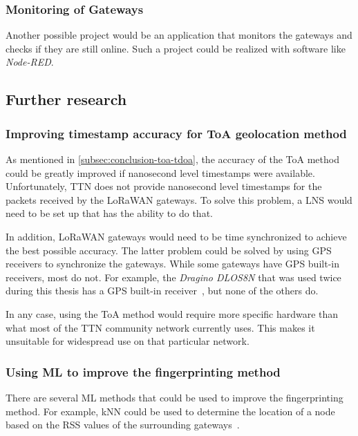 \subsubsection{Monitoring of Gateways}

Another possible project would be an application that monitors the gateways and checks if they are still online.
Such a project could be realized with software like \emph{Node-RED}.~\cite{openjs_foundation_node-red_nodate}

\subsection{Further research}

\subsubsection{Improving timestamp accuracy for \acf{ToA} geolocation method}

As mentioned in \cref{subsec:conclusion-toa-tdoa}, the accuracy of the \ac{ToA} method could be greatly improved if nanosecond level timestamps were available.
Unfortunately, \ac{TTN} does not provide nanosecond level timestamps for the packets received by the \ac{LoRaWAN} gateways.
To solve this problem, a \ac{LNS} would need to be set up that has the ability to do that.

In addition, \ac{LoRaWAN} gateways would need to be time synchronized to achieve the best possible accuracy.
The latter problem could be solved by using \ac{GPS} receivers to synchronize the gateways.
While some gateways have \ac{GPS} built-in receivers, most do not.
For example, the \emph{Dragino DLOS8N} that was used twice during this thesis has a \ac{GPS} built-in receiver~\cite{dragino_technology_co_ltd_dlos8n_2023}, but none of the others do.

In any case, using the \ac{ToA} method would require more specific hardware than what most of the \ac{TTN} community network currently uses.
This makes it unsuitable for widespread use on that particular network.

\subsubsection{Using \acf{ML} to improve the fingerprinting method}


There are several \ac{ML} methods that could be used to improve the fingerprinting method.
For example, \ac{kNN} could be used to determine the location of a node based on the \ac{RSS} values of the surrounding gateways~\cite{anagnostopoulos_reproducible_2019}.

